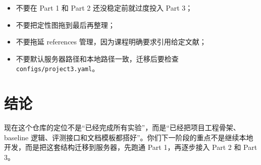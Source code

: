 \documentclass[11pt,a4paper,fontset=none]{ctexart}
\begin{document}
\begin{itemize}
  \item 不要在 Part 1 和 Part 2 还没稳定前就过度投入 Part 3；
  \item 不要把定性图拖到最后再整理；
  \item 不要拖延 references 管理，因为课程明确要求引用给定文献；
  \item 不要默认服务器路径和本地路径一致，迁移后要检查 \texttt{configs/project3.yaml}。
\end{itemize}

\section{结论}

现在这个仓库的定位不是“已经完成所有实验”，而是“已经把项目工程骨架、baseline 逻辑、评测接口和文档模板都搭好”。你们下一阶段的重点不是继续本地开发，而是把这套结构迁移到服务器，先跑通 Part 1，再逐步接入 Part 2 和 Part 3。
\end{document}
